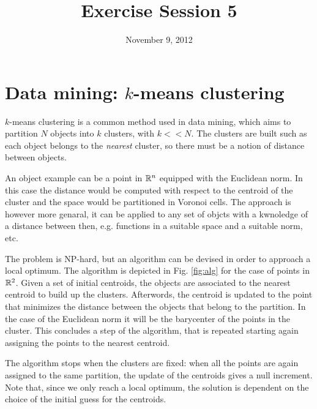 \documentclass[10pt,a4paper]{article}
\title{Exercise Session 5}
\date{November 9, 2012}
\begin{document}
\lstset{language=[ISO]C++}
\maketitle

\section*{Data mining: $k$-means clustering}

$k$-means clustering is a common method used in data mining, which aims to
partition $N$ objects into $k$ clusters, with $k << N$. The clusters are built
such as each object belongs to the \emph{nearest} cluster, so there must be a
notion of distance between objects.

An object example can be a point in $\mathbb{R}^n$ equipped with the Euclidean norm. In
this case the distance would be computed with respect to the centroid of the
cluster and the space would be partitioned in Voronoi cells. The approach is
however more genaral, it can be applied to any set of objcts with a kwnoledge of
a distance between then, e.g. functions in a suitable space and a suitable norm,
etc.

The problem is NP-hard, but an algorithm can be devised in order to approach a
local optimum. The algorithm is depicted in Fig. \ref{fig:alg} for the case of
points in $\mathbb{R}^2$. Given a set of initial centroids, the objects are associated
to the nearest centroid to build up the clusters. Afterwords, the centroid is
updated to the point that minimizes the distance between the objects that belong
to the partition. In the case of the Euclidean norm it will be the barycenter of
the points in the cluster. This concludes a step of the algorithm, that is
repeated starting again assigning the points to the nearest centroid.

The algorithm stops when the clusters are fixed: when all the points are again
assigned to the same partition, the update of the centroids gives a null
increment. Note that, since we only reach a local optimum, the solution is
dependent on the choice of the initial guess for the centroids.



%
\end{document}
